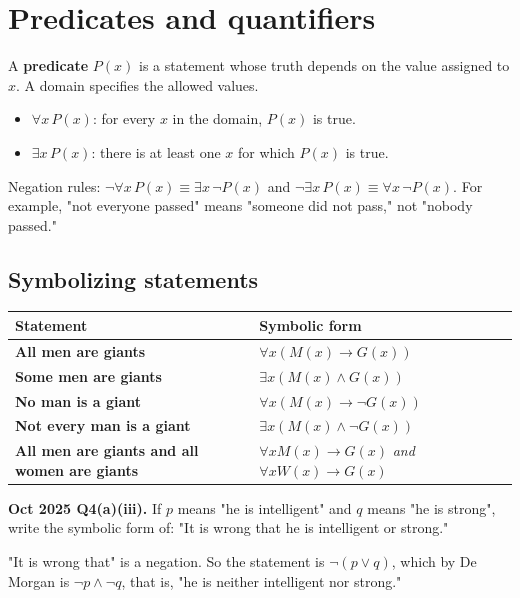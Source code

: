 \documentclass[11pt,a4paper]{article}
\begin{document}
\section{Predicates and quantifiers}

A \textbf{predicate} $P(x)$ is a statement whose truth depends on the value assigned to $x$. A domain specifies the allowed values.

\begin{itemize}
\item $\forall x\,P(x)$: for every $x$ in the domain, $P(x)$ is true.
\item $\exists x\,P(x)$: there is at least one $x$ for which $P(x)$ is true.
\end{itemize}

\begin{rememberbox}
Negation rules: $\neg\forall x\,P(x)\equiv\exists x\,\neg P(x)$ and $\neg\exists x\,P(x)\equiv\forall x\,\neg P(x)$. For example, "not everyone passed" means "someone did not pass," not "nobody passed."
\end{rememberbox}

\subsection{Symbolizing statements}
\begin{center}\small
\begin{tabularx}{\textwidth}{>{\bfseries}p{} X}
\toprule Statement & Symbolic form\\\midrule
All men are giants & $\forall x(M(x)\to G(x))$\\
Some men are giants & $\exists x(M(x)\land G(x))$\\
No man is a giant & $\forall x(M(x)\to\neg G(x))$\\
Not every man is a giant & $\exists x(M(x)\land\neg G(x))$\\
All men are giants and all women are giants & $\forall xM(x)\to G(x)$ \emph{and} $\forall xW(x)\to G(x)$\\
\end{tabularx}
\end{center}

\begin{pyqbox}
\textbf{Oct 2025 Q4(a)(iii).} If $p$ means "he is intelligent" and $q$ means "he is strong", write the symbolic form of: "It is wrong that he is intelligent or strong."
\end{pyqbox}

\begin{solbox}
"It is wrong that" is a negation. So the statement is $\neg(p\lor q)$, which by De Morgan is $\neg p\land\neg q$, that is, "he is neither intelligent nor strong."
\end{solbox}
\end{document}
